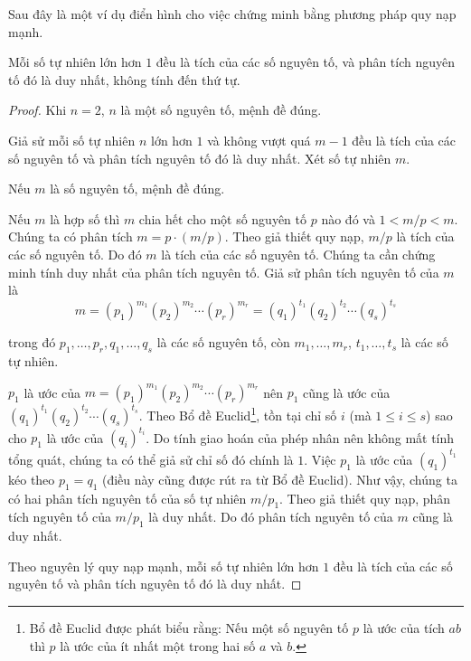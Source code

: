 Sau đây là một ví dụ điển hình cho việc chứng minh bằng phương pháp quy nạp mạnh.

\begin{example}
    Mỗi số tự nhiên lớn hơn $1$ đều là tích của các số nguyên tố, và phân tích nguyên tố đó là duy nhất, không tính đến thứ tự.
\end{example}

\begin{proof}
    Khi $n = 2$, $n$ là một số nguyên tố, mệnh đề đúng.

    Giả sử mỗi số tự nhiên $n$ lớn hơn $1$ và không vượt quá $m - 1$ đều là tích của các số nguyên tố và phân tích nguyên tố đó là duy nhất. Xét số tự nhiên $m$.

    Nếu $m$ là số nguyên tố, mệnh đề đúng.

    Nếu $m$ là hợp số thì $m$ chia hết cho một số nguyên tố $p$ nào đó và $1 < m/p < m$. Chúng ta có phân tích $m = p\cdot (m/p)$. Theo giả thiết quy nạp, $m/p$ là tích của các số nguyên tố. Do đó $m$ là tích của các số nguyên tố. Chúng ta cần chứng minh tính duy nhất của phân tích nguyên tố. Giả sử phân tích nguyên tố của $m$ là
    \[
        m = {(p_{1})}^{m_{1}}{(p_{2})}^{m_{2}}\cdots {(p_{r})}^{m_{r}} = {(q_{1})}^{t_{1}}{(q_{2})}^{t_{2}}\cdots {(q_{s})}^{t_{s}}
    \]

    trong đó $p_{1}, \ldots, p_{r}, q_{1}, \ldots, q_{s}$ là các số nguyên tố, còn $m_{1}, \ldots, m_{r}$, $t_{1}, \ldots, t_{s}$ là các số tự nhiên.

    $p_{1}$ là ước của $m = {(p_{1})}^{m_{1}}{(p_{2})}^{m_{2}}\cdots {(p_{r})}^{m_{r}}$ nên $p_{1}$ cũng là ước của ${(q_{1})}^{t_{1}}{(q_{2})}^{t_{2}}\cdots {(q_{s})}^{t_{s}}$. Theo Bổ đề Euclid\footnote{Bổ đề Euclid được phát biểu rằng: Nếu một số nguyên tố $p$ là ước của tích $ab$ thì $p$ là ước của ít nhất một trong hai số $a$ và $b$.}, tồn tại chỉ số $i$ (mà $1\leq i\leq s$) sao cho $p_{1}$ là ước của ${(q_{i})}^{t_{i}}$. Do tính giao hoán của phép nhân nên không mất tính tổng quát, chúng ta có thể giả sử chỉ số đó chính là $1$. Việc $p_{1}$ là ước của ${(q_{1})}^{t_{1}}$ kéo theo $p_{1} = q_{1}$ (điều này cũng được rút ra từ Bổ đề Euclid). Như vậy, chúng ta có hai phân tích nguyên tố của số tự nhiên $m/p_{1}$. Theo giả thiết quy nạp, phân tích nguyên tố của $m/p_{1}$ là duy nhất. Do đó phân tích nguyên tố của $m$ cũng là duy nhất.

    Theo nguyên lý quy nạp mạnh, mỗi số tự nhiên lớn hơn $1$ đều là tích của các số nguyên tố và phân tích nguyên tố đó là duy nhất.
\end{proof}

